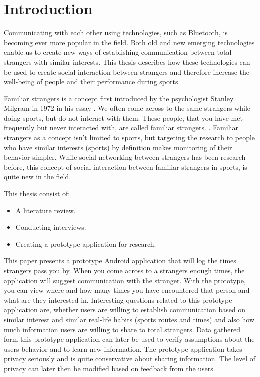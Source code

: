 
\section{Introduction}

Communicating with each other using technologies, such as Bluetooth, is becoming ever more popular in the field. Both old and new emerging technologies enable us to create new ways of establishing communication between total strangers with similar interests. This thesis describes how these technologies can be used to create social interaction between strangers and therefore increase the well-being of people and their performance during sports.

Familiar strangers is a concept first introduced by the psychologist Stanley Milgram in 1972 in his essay \citep{milgram1992}. We often come across to the same strangers while doing sports, but do not interact with them. These people, that you have met frequently but never interacted with, are called familiar strangers. \citep{familiarStranger}. Familiar strangers as a concept isn't limited to sports, but targeting the research to people who have similar interests (sports) by definition makes monitoring of their behavior simpler. While social networking between strangers has been research before, this concept of social interaction between familiar strangers in sports, is quite new in the field.

This thesis consist of:
\begin{itemize}
\item A literature review.
\item Conducting interviews.
\item Creating a prototype application for research.
\end{itemize}

This paper presents a prototype Android application that will log the times strangers pass you by. When you come across to a strangers enough times, the application will suggest communication with the stranger. With the prototype, you can view where and how many times you have encountered that person and what are they interested in. Interesting questions related to this prototype application are, whether users are willing to establish communication based on similar interest and similar real-life habits (sports routes and times) and also how much information users are willing to share to total strangers. Data gathered form this prototype application can later be used to verify assumptions about the users behavior and to learn new information. The prototype application takes privacy seriously and is quite conservative about sharing information. The level of privacy can later then be modified based on feedback from the users.

